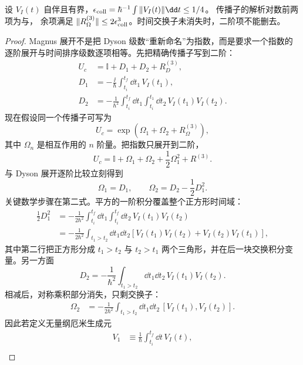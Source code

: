 \begin{proposition}
设 $V_I(t)$ 自伴且有界，$\epsilon_{\rm coll}=\hbar^{-1}\int\|V_I(t)\|\dd t\le1/4$。
传播子的解析对数前两项为与，
余项满足 $\|R_\Omega^{(3)}\|\le2\epsilon_{\rm coll}^3$。时间交换子未消失时，二阶项不能删去。
\end{proposition}
\begin{proof}
Magnus 展开不是把 Dyson 级数“重新命名”为指数，而是要求一个指数的逐阶展开与时间排序级数逐项相等。先把精确传播子写到二阶：
\begin{align*}
 U_c
 &=\mathbb I+D_1+D_2+R_D^{(3)},\\
 D_1
 &=-\frac{\ii}{\hbar}\int_{t_i}^{t_f}\dd t_1\,V_I(t_1),\\
 D_2
 &=-\frac{1}{\hbar^2}
 \int_{t_i}^{t_f}\dd t_1
 \int_{t_i}^{t_1}\dd t_2\,
 V_I(t_1)V_I(t_2).
\end{align*}
现在假设同一个传播子可写为
\[
 U_c=\exp(\Omega_1+\Omega_2+R_\Omega^{(3)}),
\]
其中 $\Omega_n$ 是相互作用的 $n$ 阶量。把指数只展开到二阶，
\begin{equation*}
 U_c
 =\mathbb I+\Omega_1+\Omega_2
 +\frac12\Omega_1^2+R^{(3)}.
\end{equation*}
与 Dyson 展开逐阶比较立刻得到
\begin{equation*}
 \Omega_1=D_1,
 \qquad
 \Omega_2=D_2-\frac12D_1^2.
\end{equation*}
关键数学步骤在第二式。平方的一阶积分覆盖整个正方形时间域：
\begin{align*}
 \frac12D_1^2
 &=-\frac{1}{2\hbar^2}
 \int_{t_i}^{t_f}\dd t_1\int_{t_i}^{t_f}\dd t_2\,
 V_I(t_1)V_I(t_2)\\
 &=-\frac{1}{2\hbar^2}
 \int_{t_1>t_2}\dd t_1\dd t_2
 \left[V_I(t_1)V_I(t_2)+V_I(t_2)V_I(t_1)\right],
\end{align*}
其中第二行把正方形分成 $t_1>t_2$ 与 $t_2>t_1$ 两个三角形，并在后一块交换积分变量。另一方面
\begin{equation*}
 D_2=-\frac{1}{\hbar^2}
 \int_{t_1>t_2}\dd t_1\dd t_2\,
 V_I(t_1)V_I(t_2).
\end{equation*}
相减后，对称乘积部分消失，只剩交换子：
\begin{align*}
 \Omega_2
 &=-\frac{1}{2\hbar^2}
 \int_{t_1>t_2}\dd t_1\dd t_2\,
 \left[V_I(t_1),V_I(t_2)\right].
\end{align*}
因此若定义无量纲厄米生成元
\begin{align*}
 V_1&\equiv\frac1\hbar\int_{t_i}^{t_f}\dd t\,V_I(t),\\

\end{align*}
\end{proof}
